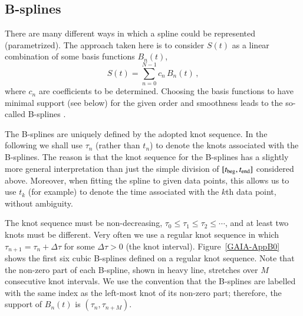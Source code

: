\documentclass[structabstract]{aa}
\begin{document}
\subsection{B-splines}\label{sec:bsplines}

There are many different ways in which a spline could be represented
(parametrized). The approach taken here is to consider $S(t)$ as a
linear combination of some basis functions $B_n(t)$,
\begin{equation}\label{eq:AppB0}
S(t) = \sum_{n=0}^{N-1} c_n\, B_n(t) \, ,
\end{equation}
where $c_n$ are coefficients to be determined. Choosing the basis
functions to have minimal support (see below) for the given order
and smoothness leads to the so-called B-splines \citep{book:DB-01}.

The B-splines are uniquely defined by the adopted knot sequence.
In the following we shall use $\tau_n$ (rather than $t_n$) to denote
the knots associated with the B-splines. The reason is that the knot
sequence for the B-splines has a slightly more general interpretation
than just the simple division of $[t_{\rm beg},t_{\rm end}]$ considered
above. Moreover, when fitting the spline to given data points, this
allows us to use $t_k$ (for example) to denote the time associated with
the $k$th data point, without ambiguity.

The knot sequence must be non-decreasing, $\tau_0 \le \tau_1 \le
\tau_2 \le \cdots$, and at least two knots must be different.
Very often we use a regular knot sequence in which
$\tau_{n+1}=\tau_n+\Delta\tau$ for some $\Delta\tau>0$ (the knot
interval). Figure~\ref{GAIA-AppB0} shows the first six cubic B-splines
defined on a regular knot sequence. Note that the non-zero part of
each B-spline, shown in heavy line, stretches over $M$ consecutive
knot intervals. We use the convention that the B-splines are
labelled with the same index as the left-most knot of its non-zero
part; therefore, the support of $B_n(t)$ is $(\tau_n,\tau_{n+M})$.
\end{document}
